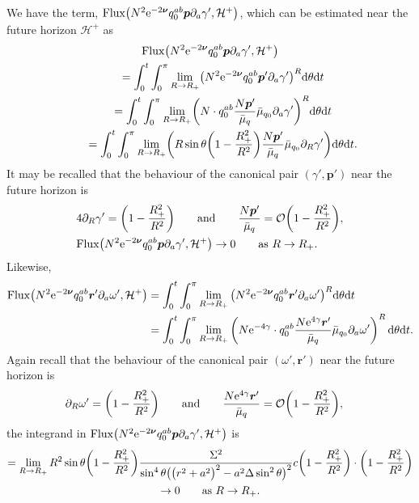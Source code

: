\documentclass[11pt]{article}
\numberwithin{equation}{section}
\def\ptl{\partial}%
\def\mbo#1{\boldsymbol{#1}}%
\numberwithin{equation}{section}
\begin{document}
We have the term, ${\rm Flux} \bigl(N^2 {\rm e}^{-2 \mbo{\nu}}q^{ab}_0 \mbo{p} \ptl_a \gamma', \mathcal{H}^+\bigr)$, which can be estimated near the future horizon $\mathcal{H}^+$ as
\begin{gather*}
 {\rm Flux} \bigl(N^2 {\rm e}^{-2 \mbo{\nu}}q^{ab}_0 \mbo{p} \ptl_a \gamma', \mathcal{H}^+\bigr) \notag\\
\qquad{} =
\int^t_0 \int^\pi_0 \lim_{R \to R_+} \bigl(
N^2 {\rm e}^{-2 \mbo{\nu}}q^{ab}_0 \mbo{p}' \ptl_a \gamma' \bigr)^R {\rm d} \theta {\rm d}t \notag\\
\qquad{} = \int^t_0 \int^\pi_0 \lim_{R \to R_+} \biggl( N \cdot q^{ab}_0 \frac{N \mbo{p}'}{\bar{\mu}_q} \bar{\mu}_{q_0} \ptl_a \gamma' \biggr)^R {\rm d}\theta {\rm d}t \notag\\
\qquad{} = \int^t_0 \int^\pi_0 \lim_{R \to R_+} \biggl( R \sin \theta\biggl(1- \frac{R^2_+}{R^2} \biggr) \frac{N \mbo{p}' }{\bar{\mu}_q} \bar{\mu}_{q_0} \ptl_R \gamma' \biggr) {\rm d}\theta {\rm d}t.
\end{gather*}
It may be recalled that the behaviour of the canonical pair $(\gamma',\mbo{p}') $ near the future horizon is
\begin{align*}
&4 \ptl_R \gamma'= \biggl(1- \frac{R^2_+}{R^2} \biggr) \qquad \text{and} \qquad \frac{N \mbo{p}'}{\bar{\mu}_q} = \mathcal{O} \biggl(1- \frac{R^2_+}{R^2} \biggr), \notag\\
&{\rm Flux} \bigl(N^2 {\rm e}^{-2 \mbo{\nu}}q^{ab}_0 \mbo{p} \ptl_a \gamma', \mathcal{H}^+\bigr) \to 0 \qquad \text{as} \ R \to R_+.
\end{align*}
Likewise,
\begin{align*}
{\rm Flux} \bigl(N^2 {\rm e}^{-2 \mbo{\nu}}q^{ab}_0 \mbo{r}' \ptl_a \omega', \mathcal{H}^+\bigr)%
&{}=
\int^t_0 \int^\pi_0 \lim_{R \to R_+} \big( N^2 {\rm e}^{-2 \mbo{\nu}}q^{ab}_0 \mbo{r}' \ptl_a \omega' \big)^R {\rm d}\theta {\rm d} t \notag\\
&{}= \int^t_0 \int^\pi_0 \lim_{R \to R_+} \left( N {\rm e}^{-4\gamma} \cdot q^{ab}_0 \frac{N {\rm e}^{4\gamma} \mbo{r}'}{\bar{\mu}_q} \bar{\mu}_{q_0} \ptl_a \omega' \right)^R {\rm d}\theta {\rm d}t. \notag
\end{align*}
Again recall that the behaviour of the canonical pair $(\omega', \mbo{r}')$ near the future horizon is
\begin{align*}
\ptl_R \omega' &{}= \biggl(1- \frac{R^2_+}{R^2} \biggr) \qquad \text{and} \qquad \frac{N {\rm e}^{4 \gamma} \mbo{r}'}{\bar{\mu}_q} = \mathcal{O}\biggl(1- \frac{R^2_+}{R^2} \biggr), \end{align*}
the integrand in ${\rm Flux} \bigl(N^2 {\rm e}^{-2 \mbo{\nu}}q^{ab}_0 \mbo{p} \ptl_a \gamma', \mathcal{H}^+\bigr)$ is
\begin{gather*}
= \lim_{R \to R_+} R^2 \sin \theta \biggl(1- \frac{R^2_+}{R^2} \biggr) \frac{\Sigma^2}{ \sin^4 \theta \bigl(\bigl(r^2+a^2\bigr)^2-a^2 \Delta \sin^2 \theta \bigr)^2}
 c \biggl(1-\frac{R^2_+}{R^2} \biggr) \cdot \biggl(1-\frac{R^2_+}{R^2} \biggr) \notag\\
 \to 0 \qquad \text{as} \ R \to R_+.
\end{gather*}
\end{document}
